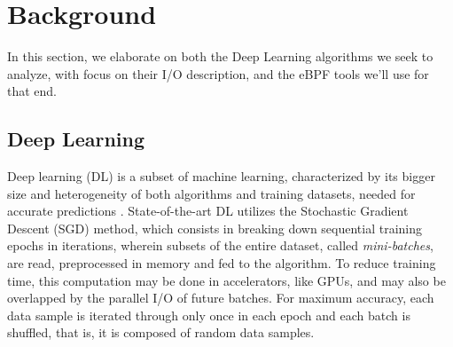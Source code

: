 \documentclass[conference]{IEEEtran}
\begin{document}
\section{Background}



In this section, we elaborate on both the Deep Learning algorithms we seek to analyze, with focus on their I/O description, and the eBPF tools we'll use for that end.

\subsection{Deep Learning}

Deep learning (DL) is a subset of machine learning, characterized by its bigger size and heterogeneity of both algorithms and training datasets, needed for accurate predictions \cite{gradient}. State-of-the-art DL utilizes the Stochastic Gradient Descent (SGD) method, which consists in breaking down sequential training epochs in iterations, wherein subsets of the entire dataset, called \textit{mini-batches}, are read, preprocessed in memory and fed to the algorithm. To reduce training time, this computation may be done in accelerators, like GPUs, and may also be overlapped by the parallel I/O of future batches. For maximum accuracy, each data sample is iterated through only once in each epoch and each batch is shuffled, that is, it is composed of random data samples.
\end{document}
